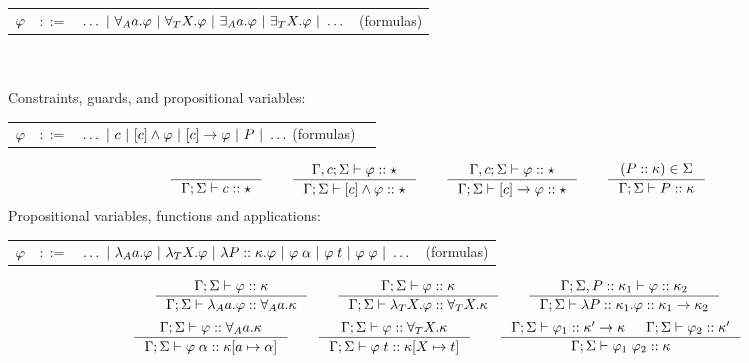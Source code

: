 \documentclass[english, mgr]{iithesis}
\begin{document}
\begin{tabular}{rrlr}
$\varphi$ & $::=$ & $\ldots
               \ |\  \forall_A a . \varphi
               \ |\  \forall_T X . \varphi
               \ |\  \exists_A a . \varphi
               \ |\  \exists_T X . \varphi
               \ |\  \ldots$
    & (formulas)
\end{tabular}
\\ \\
Constraints, guards, and propositional variables:

\begin{tabular}{rrlr}
$\varphi$ & $::=$ & $\ldots
               \ |\  c
               \ |\  [c]\wedge \varphi
               \ |\  [c]\to \varphi
               \ |\  P
               \ |\  \ldots$  (formulas)
\end{tabular}
$$
\inference{
}{
  \cEnv; \kEnv \vdash \fConstr{\constr} \ofkind \kProp
}
\qquad
\inference{
  \cEnv,\constr; \kEnv \vdash \formphi \ofkind \kProp
}{
  \cEnv; \kEnv \vdash \fCAnd{\constr} \formphi \ofkind \kProp
}
\qquad
\inference{
  \cEnv,\constr; \kEnv \vdash \formphi \ofkind \kProp
}{
  \cEnv; \kEnv \vdash \fCImp{\constr} \formphi \ofkind \kProp
}
\qquad
\inference{
  (\propv \ofkind \kind) \in \kEnv
}{
  \cEnv; \kEnv \vdash  \propv \ofkind \kind
}
$$
Propositional variables, functions and applications:

\begin{tabular}{rrlr}
$\varphi$ & $::=$ & $\ldots
               \ |\  \lambda_A a . \varphi
               \ |\  \lambda_T X . \varphi
               \ |\  \lambda P :: \kappa. \varphi
               \ |\  \varphi \;\alpha
               \ |\  \varphi \;t
               \ |\  \varphi \; \varphi
               \ |\  \ldots$
    & (formulas)
\end{tabular}
$$
\inference{
  \cEnv; \kEnv \vdash \formphi \ofkind \kind
}{
  \cEnv; \kEnv \vdash \fLamAtom{\atomv} \formphi \ofkind \kForallAtom{\atomv}\kind
}
\qquad
\inference{
  \cEnv; \kEnv \vdash \formphi \ofkind \kind
}{
  \cEnv; \kEnv \vdash \fLamTerm{\termv} \formphi \ofkind \kForallTerm{\termv}\kind
}
\qquad
\inference{
  \cEnv; \kEnv, \propv \ofkind \kind_1 \vdash \formphi \ofkind \kind_2
}{
  \cEnv; \kEnv \vdash \fLamForm{\propv}{\kind_1} \formphi \ofkind \kind_1 \karrow \kind_2
}
$$
$$
\inference{
  \cEnv;\kEnv\vdash \formphi \ofkind \kForallAtom{\atomv}\kind
}{
  \cEnv;\kEnv\vdash \formphi \fAppAtom{\atomexp} \ofkind \kind[\atomv \mapsto \atomexp]
}
\qquad
\inference{
  \cEnv;\kEnv\vdash \formphi \ofkind \kForallTerm{\termv}\kind
}{
  \cEnv;\kEnv\vdash \formphi \fAppTerm{\term} \ofkind \kind[\termv \mapsto \term]
}
\qquad
\inference{
  \cEnv; \kEnv \vdash \formphi_1 \ofkind \kind' \karrow \kind &
  \cEnv; \kEnv \vdash \formphi_2 \ofkind \kind'
}{
  \cEnv;\kEnv\vdash \formphi_1 \fApp \formphi_2 \ofkind \kind
}
$$
\end{document}
